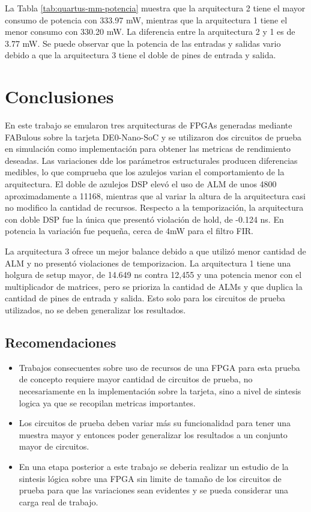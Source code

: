 La Tabla \ref{tab:quartus-mm-potencia} muestra que la arquitectura 2 tiene el mayor consumo de potencia con 333.97 mW, mientras que la arquitectura 1 tiene el menor consumo con 330.20 mW. La diferencia entre la arquitectura 2 y 1 es de 3.77 mW. Se puede observar que la potencia de las entradas y salidas vario debido a que la arquitectura 3 tiene el doble de pines de entrada y salida.


\chapter{Conclusiones}
\label{ch:conclu}

En este trabajo se emularon tres arquitecturas de FPGAs generadas mediante FABulous sobre la tarjeta DE0-Nano-SoC y se utilizaron dos circuitos de prueba en simulación como implementación para obtener las metricas de rendimiento deseadas. Las variaciones dde los parámetros estructurales producen diferencias medibles, lo que comprueba que los azulejos varian el comportamiento de la arquitectura. El doble de azulejos DSP elevó el uso de ALM de unos 4800 aproximadamente a 11168, mientras que al variar la altura de la arquitectura casi no modifico la cantidad de recursos. Respecto a la temporización, la arquitectura con doble DSP fue la única que presentó violación de hold, de -0.124 ns. En potencia la variación fue pequeña, cerca de 4mW para el filtro FIR.

La arquitectura 3 ofrece un mejor balance debido a que utilizó menor cantidad de ALM y no presentó violaciones de temporizacion. La arquitectura 1 tiene una holgura de setup mayor, de 14.649 ns contra 12,455 y una potencia menor con el multiplicador de matrices, pero se prioriza la cantidad de ALMs y que duplica la cantidad de pines de entrada y salida. Esto solo para los circuitos de prueba utilizados, no se deben generalizar los resultados.

\section{Recomendaciones}

\begin{itemize}
  \item Trabajos consecuentes sobre uso de recursos de una FPGA para esta prueba de concepto requiere mayor cantidad de circuitos de prueba, no necesariamente en la implementación sobre la tarjeta, sino a nivel de sintesis logica ya que se recopilan metricas importantes.
  \item Los circuitos de prueba deben variar más su funcionalidad para tener una muestra mayor y entonces poder generalizar los resultados a un conjunto mayor de circuitos.
  \item En una etapa posterior a este trabajo se deberia realizar un estudio de la sintesis lógica sobre una FPGA sin limite de tamaño de los circuitos de prueba para que las variaciones sean evidentes y se pueda considerar una carga real de trabajo.
\end{itemize}